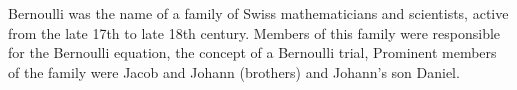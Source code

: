 Bernoulli was the name of a family of Swiss mathematicians
and scientists, active from the late 17th to late 18th
century. Members of this family were responsible for
the Bernoulli equation, the concept of a Bernoulli trial,
Prominent members of the family were Jacob and Johann (brothers)
and Johann's son Daniel.
